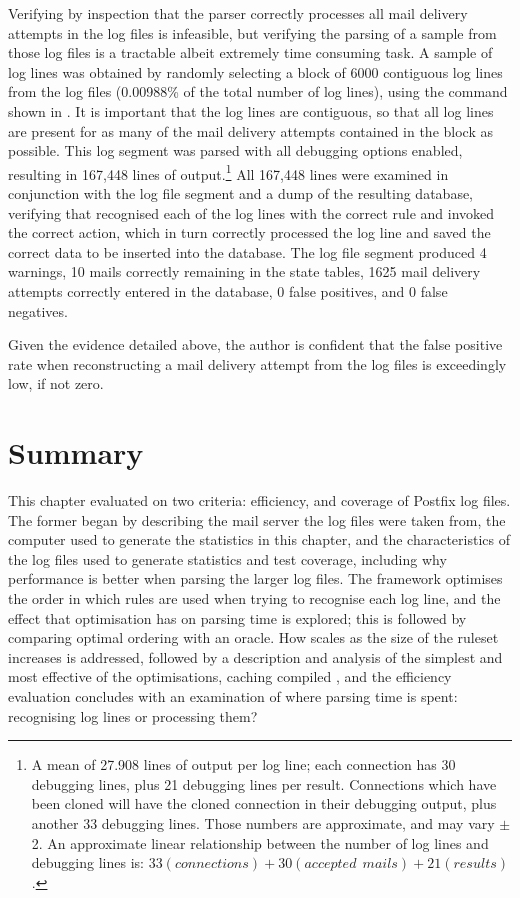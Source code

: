 Verifying by inspection that the parser correctly processes all
\numberOFconnectionsINlogFILES{} mail delivery attempts in the
\numberOFlogFILES{} log files is infeasible, but verifying the parsing of a
sample from those log files is a tractable albeit extremely time consuming
task.  A sample of log lines was obtained by randomly selecting a block of
6000 contiguous log lines from the \numberOFlogFILES{} log files (0.00988\%
of the total number of log lines), using the command shown in
.  It is
important that the log lines are contiguous, so that all log lines are
present for as many of the mail delivery attempts contained in the block as
possible.  This log segment was parsed with all debugging options enabled,
resulting in 167,448 lines of output.\footnote{A mean of 27.908 lines of
output per log line; each connection has 30 debugging lines, plus 21
debugging lines per result.  Connections which have been cloned will have
the cloned connection in their debugging output, plus another 33 debugging
lines.  Those numbers are approximate, and may vary $\pm{}$ 2.  An
approximate linear relationship between the number of log lines and
debugging lines is: $33(connections) + 30(accepted~~mails) + 21(results)$.}
All 167,448 lines were examined in conjunction with the log file segment
and a dump of the resulting database, verifying that \parsername{}
recognised each of the log lines with the correct rule and invoked the
correct action, which in turn correctly processed the log line and saved
the correct data to be inserted into the database.  The log file segment
produced 4 warnings, 10 mails correctly remaining in the state tables, 1625
mail delivery attempts correctly entered in the database, 0 false
positives, and 0 false negatives.

Given the evidence detailed above, the author is confident that the false
positive rate when reconstructing a mail delivery attempt from the
\numberOFlogFILES{} log files is exceedingly low, if not zero.

\section{Summary}

This chapter evaluated \parsername{} on two criteria: efficiency, and
coverage of Postfix log files.  The former began by describing the mail
server the log files were taken from, the computer used to generate the
statistics in this chapter, and the characteristics of the
\numberOFlogFILES{} log files used to generate statistics and test
coverage, including why performance is better when parsing the larger log
files.  The framework optimises the order in which rules are used when
trying to recognise each log line, and the effect that optimisation has on
parsing time is explored; this is followed by comparing optimal ordering
with an oracle.  How \parsername{} scales as the size of the ruleset
increases is addressed, followed by a description and analysis of the
simplest and most effective of the optimisations, caching compiled
\regexes{}, and the efficiency evaluation concludes with an examination of
where parsing time is spent: recognising log lines or processing them?

